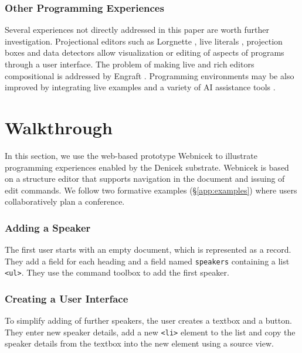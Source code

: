 \documentclass[sigconf,anonymous,screen]{acmart}
\newcommand*\circled[1]{\textnormal{\footnotesize\sffamily\bfseries\protect\tikz[baseline=(char.base)]{
  \node[shape=circle,fill=black,text=white,draw,inner sep=1pt] (char) {#1};}}}
\begin{document}
\subsubsection*{Other Programming Experiences}
Several experiences not directly addressed in this paper are worth further investigation.
Projectional editors such as Lorgnette \cite{gobert-2023-lorgnette},
live literals \cite{omar-2021-livelits}, projection boxes \cite{lerner-2020-boxes} and data detectors
\cite{nardi-1998-agents} allow visualization or editing of aspects of programs through a user interface.
The problem of making live and rich editors compositional is addressed by
Engraft \cite{horowitz-2023-engraft}. Programming environments may be also improved by integrating
live examples \cite{rauch-2019-babylonian} and a variety of AI assistance
tools \cite{petricek-2023-aias,blinn-2024-llms,mcnutt-2023-nbai}.



\section{Walkthrough}
\label{sec:walk}

In this section, we use the web-based prototype Webnicek to illustrate programming
experiences enabled by the Denicek substrate. Webnicek is based on a structure
editor that supports navigation in the document and issuing of edit commands. We follow two
formative examples (\S\ref{app:examples}) where users collaboratively plan a conference.

\subsubsection*{\circled{A} Adding a Speaker}
The first user starts with an empty document, which is represented as a record. They add a field for
each heading and a field named {\small\Verb_speakers_} containing a list {\small\Verb_<ul>_}. They
use the command toolbox to add the first speaker.

\subsubsection*{\circled{B} Creating a User Interface} To simplify adding of
further speakers, the user creates a textbox and a button. They enter new speaker
details, add a new {\small\Verb_<li>_} element to the list and copy the speaker details
from the textbox into the new element using a source view.
\end{document}
